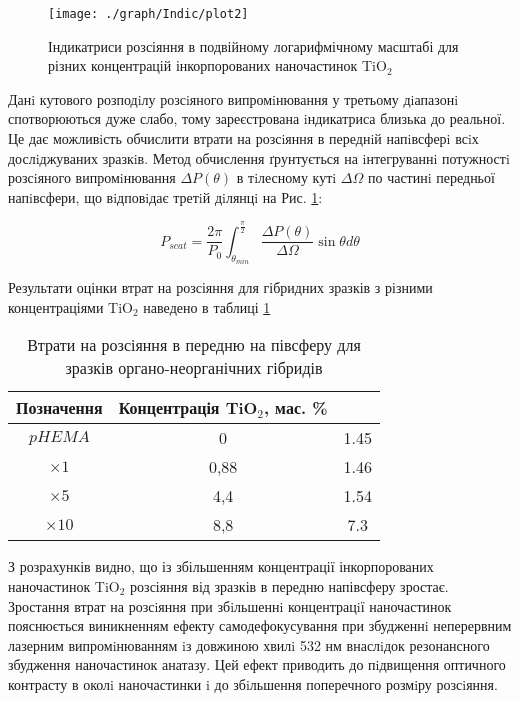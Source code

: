 \begin{figure}
\texttt{[image: ./graph/Indic/plot2]}
\caption{Індикатриси розсіяння в подвійному логарифмічному масштабі для різних концентрацій інкорпорованих наночастинок TiO$_2$}\label{fig:ind3}
\end{figure}

Данi кутового розподiлу розсiяного випромiнювання у третьому дiапазонi
спотворюються дуже слабо, тому зареєстрована iндикатриса близька до реальної. Це
дає можливiсть обчислити втрати на розсiяння в переднiй напiвсферi всiх
дослiджуваних зразкiв. Метод обчислення ґрунтується на iнтегруваннi потужностi
розсiяного випромiнювання $\Delta P(\theta)$ в тiлесному кутi $\Delta \Omega$ по частинi передньої
напiвсфери, що вiдповiдає третiй дiлянцi на Рис. \ref{fig:ind3}:

\begin{equation}\label{eq:P_scat}
P_{scat} = \frac{2\pi}{P_0} \int_{\theta_{min}}^{\frac{\pi}{2}} \frac{\Delta P(\theta)}{\Delta \Omega} \sin{\theta} d\theta 
\end{equation}

Результати оцінки втрат на розсіяння для гібридних зразків з різними концентраціями TiO$_2$ наведено в таблиці \ref{tab:TabInd}

\begin{table}
\centering
\begin{tabular}{|c|c|c|}
\hline
Позначення & Концентрація TiO$_2$, мас. \% & \\ \hline

$pHEMA$		&	0		&	1.45 \\\hline
$\times1$	&	0,88	&	1.46 \\\hline
$\times5$	&	4,4		&	1.54\\\hline
$\times10$	&	8,8		&	7.3\\\hline
\end{tabular}
\caption{Втрати на розсіяння в передню на півсферу для зразків органо-неорганічних гібридів}\label{tab:TabInd}
\end{table}

З розрахунків видно, що із збільшенням концентрації інкорпорованих наночастинок TiO$_2$ розсіяння від зразків в передню напівсферу зростає. Зростання втрат на розсiяння при збiльшеннi концентрацiї наночастинок пояснюється виникненням ефекту самодефокусування при
збудженнi неперервним лазерним випромiнюванням iз довжиною хвилi 532 нм
внаслiдок резонансного збудження наночастинок анатазу. Цей ефект приводить до
пiдвищення оптичного контрасту в околi наночастинки i до збiльшення поперечного
розмiру розсiяння.


